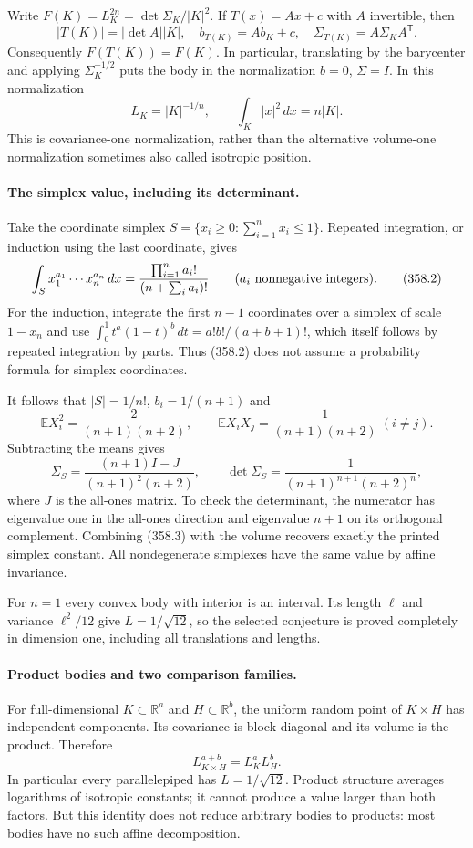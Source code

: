 \documentclass[11pt]{article}
\begin{document}
Write $F(K)=L_K^{2n}=\det\Sigma_K/|K|^2$. If $T(x)=Ax+c$
with $A$ invertible, then
\[
 |T(K)|=|\det A||K|,\quad b_{T(K)}=Ab_K+c,
 \quad\Sigma_{T(K)}=A\Sigma_KA^{\mathsf T}.
\]
Consequently $F(T(K))=F(K)$. In particular, translating by the
barycenter and applying $\Sigma_K^{-1/2}$ puts the body in the
normalization $b=0$, $\Sigma=I$. In this normalization
\[
 L_K=|K|^{-1/n},\qquad \int_K|x|^2\,dx=n|K|.
 \tag{358.1}
\]
This is covariance-one normalization, rather than the alternative
volume-one normalization sometimes also called isotropic position.

\paragraph{The simplex value, including its determinant.}
Take the coordinate simplex
$S=\{x_i\geq0:\sum_{i=1}^nx_i\leq1\}$. Repeated integration,
or induction using the last coordinate, gives
\[
 \int_Sx_1^{a_1}\cdots x_n^{a_n}\,dx
  =\frac{\prod_{i=1}^na_i!}{(n+\sum_i a_i)!}
 \qquad(a_i\hbox{ nonnegative integers}).
 \tag{358.2}
\]
For the induction, integrate the first $n-1$ coordinates over a
simplex of scale $1-x_n$ and use
$\int_0^1t^a(1-t)^b\,dt=a!b!/(a+b+1)!$, which itself follows
by repeated integration by parts. Thus (358.2) does not assume a
probability formula for simplex coordinates.

It follows that $|S|=1/n!$, $b_i=1/(n+1)$ and
\[
 \mathbb E X_i^2=\frac2{(n+1)(n+2)},\qquad
 \mathbb E X_iX_j=\frac1{(n+1)(n+2)}\ (i\ne j).
\]
Subtracting the means gives
\[
 \Sigma_S=\frac{(n+1)I-J}{(n+1)^2(n+2)},
 \qquad
 \det\Sigma_S=\frac1{(n+1)^{n+1}(n+2)^n},
 \tag{358.3}
\]
where $J$ is the all-ones matrix. To check the determinant, the
numerator has eigenvalue one in the all-ones direction and eigenvalue
$n+1$ on its orthogonal complement. Combining (358.3) with the volume
recovers exactly the printed simplex constant. All nondegenerate
simplexes have the same value by affine invariance.

For $n=1$ every convex body with interior is an interval. Its length
$\ell$ and variance $\ell^2/12$ give $L=1/\sqrt{12}$, so the
selected conjecture is proved completely in dimension one, including
all translations and lengths.

\paragraph{Product bodies and two comparison families.}
For full-dimensional $K\subset\mathbb R^a$ and
$H\subset\mathbb R^b$, the uniform random point of $K\times H$
has independent components. Its covariance is block diagonal and
its volume is the product. Therefore
\[
 L_{K\times H}^{a+b}=L_K^aL_H^b.
 \tag{358.4}
\]
In particular every parallelepiped has $L=1/\sqrt{12}$. Product
structure averages logarithms of isotropic constants; it cannot
produce a value larger than both factors. But this identity does
not reduce arbitrary bodies to products: most bodies have no such
affine decomposition.
\end{document}
